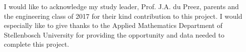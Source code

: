 

\begin{acknowledgements}      %
I would like to acknowledge my study leader, Prof. J.A. du Preez, parents and the engineering class of 2017 for their kind contribution to this project. I would especially like to give thanks to the Applied Mathematics Department of Stellenbosch University for providing the opportunity and data needed to complete this project.
\end{acknowledgements}
